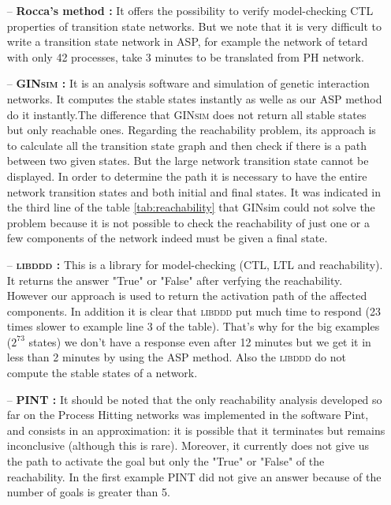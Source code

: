 \begin{itemize}

\item[--] \textbf{Rocca's method :} It offers the possibility to verify model-checking CTL properties of transition state networks. But we note that it is very difficult to write a transition state network in ASP, for example the network of tetard \cite{khalis2009smbionet} with only 42 processes, take 3 minutes to be translated from PH network.

\item[--] \textbf{\textsc{GINsim} :} It is an analysis software and simulation of genetic interaction networks. It computes the stable states instantly as welle as our ASP method do it instantly.The difference that \textsc{GINsim} does not return all stable states but only reachable ones. Regarding the reachability problem, its approach is to calculate all the transition state graph and then check if there is a path between two given states. But the large network transition state cannot be displayed. In order to determine the path it is necessary to have the entire network transition states and both initial and final states. It was indicated in the third line of the table \ref{tab:reachability} that GINsim could not solve the problem because it is not possible to check the reachability of just one or a few components of the network indeed must be given a final state. 

\item[--] \textbf{\textsc{libddd} :}
This is a library for model-checking (CTL, LTL and reachability). It returns the answer "True" or "False" after verfying the reachability. However our approach is used to return the activation path of the affected components. In addition it is clear that \textsc{libddd} put much time to respond (23 times slower to example line 3 of the table). That's why for the big examples ($2^{73}$ states) we don't have a response even after 12 minutes but we get it in less than 2 minutes by using the ASP method. Also the \textsc{libddd} do not compute the stable states of a network.

\item[--] \textbf{PINT : }It should be noted that the only reachability analysis developed so far on the Process Hitting networks was implemented in the software Pint, and consists in an approximation: it is possible that it terminates but remains inconclusive (although this is rare). Moreover, it currently does not give us the path to activate the goal but only the "True" or "False" of the reachability. In the first example \textsc{PINT} did not give an answer because of the number of goals is greater than 5.
\end{itemize}

